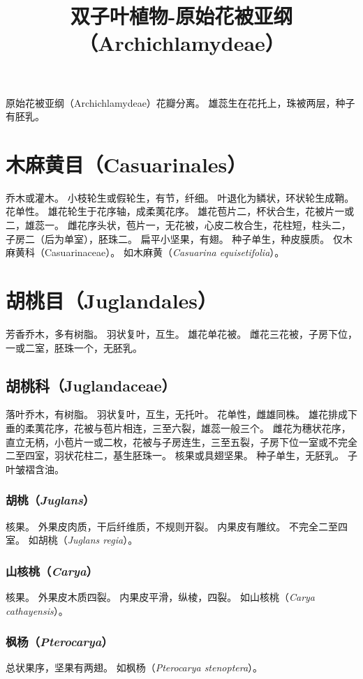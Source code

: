 \documentclass[11pt]{article}
\title{双子叶植物-原始花被亚纲（Archichlamydeae）}
\date{}
\begin{document}
\begin{sloppypar}
  \maketitle

  \linenumbers
原始花被亚纲（Archichlamydeae）花瓣分离。
雄蕊生在花托上，珠被两层，种子有胚乳。

\section{木麻黄目（Casuarinales）}
乔木或灌木。
小枝轮生或假轮生，有节，纤细。
叶退化为鳞状，环状轮生成鞘。
花单性。
雄花轮生于花序轴，成柔荑花序。
雄花苞片二，杯状合生，花被片一或二，雄蕊一。
雌花序头状，苞片一，无花被，心皮二枚合生，花柱短，柱头二，子房二（后为单室），胚珠二。
扁平小坚果，有翅。
种子单生，种皮膜质。
仅木麻黄科（Casuarinaceae）。
如木麻黄（\textit{Casuarina equisetifolia}）。

\section{胡桃目（Juglandales）}
芳香乔木，多有树脂。
羽状复叶，互生。
雄花单花被。
雌花三花被，子房下位，一或二室，胚珠一个，无胚乳。

\subsection{胡桃科（Juglandaceae）}
落叶乔木，有树脂。
羽状复叶，互生，无托叶。
花单性，雌雄同株。
雄花排成下垂的柔荑花序，花被与苞片相连，三至六裂，雄蕊一般三个。
雌花为穗状花序，直立无柄，小苞片一或二枚，花被与子房连生，三至五裂，子房下位一室或不完全二至四室，羽状花柱二，基生胚珠一。
核果或具翅坚果。
种子单生，无胚乳。
子叶皱褶含油。

\subsubsection{胡桃（\textit{Juglans}）}
核果。
外果皮肉质，干后纤维质，不规则开裂。
内果皮有雕纹。
不完全二至四室。
如胡桃（\textit{Juglans regia}）。

\subsubsection{山核桃（\textit{Carya}）}
核果。
外果皮木质四裂。
内果皮平滑，纵棱，四裂。
如山核桃（\textit{Carya cathayensis}）。

\subsubsection{枫杨（\textit{Pterocarya}）}
总状果序，坚果有两翅。
如枫杨（\textit{Pterocarya stenoptera}）。


\end{sloppypar}
\end{document}
